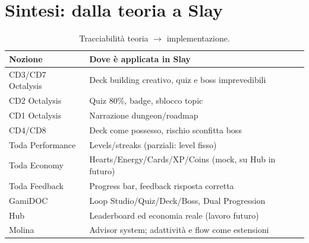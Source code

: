 \chapter{Sintesi: dalla teoria a Slay}
\label{ch:sintesi}

\begin{table}[h]
\centering\small
\begin{tabular}{@{}lp{7cm}@{}}
\toprule
Nozione & Dove è applicata in Slay \\
\midrule
CD3/CD7 Octalysis & Deck building creativo, quiz e boss imprevedibili \\
CD2 Octalysis & Quiz 80\%, badge, sblocco topic \\
CD1 Octalysis & Narrazione dungeon/roadmap \\
CD4/CD8 & Deck come possesso, rischio sconfitta boss \\
Toda Performance & Levels/streaks (parziali: level fisso) \\
Toda Economy & Hearts/Energy/Cards/XP/Coins (mock, su Hub in futuro) \\
Toda Feedback & Progress bar, feedback risposta corretta \\
GamiDOC & Loop Studio/Quiz/Deck/Boss, Dual Progression \\
Hub & Leaderboard ed economia reale (lavoro futuro) \\
Molina & Advisor system; adattività e flow come estensioni \\
\bottomrule
\end{tabular}
\caption{Tracciabilità teoria $\rightarrow$ implementazione.}
\label{tab:sintesi}
\end{table}
